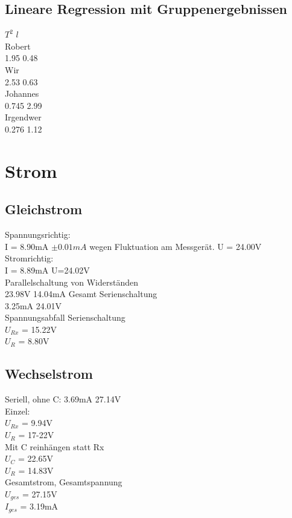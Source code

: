 \documentclass[12pt,a4paper]{article}
\begin{document}
\begin{multicols}{2}
\subsection{Lineare Regression mit Gruppenergebnissen}

$T^2$ $l$\\
Robert\\
1.95
0.48\\
Wir\\
2.53
0.63\\
Johannes\\
0.745
2.99\\
Irgendwer\\
0.276
1.12\\
\section{Strom}

\subsection{Gleichstrom}
Spannungsrichtig:\\
I = 8.90mA $\pm 0.01mA$ wegen Fluktuation am Messgerät.
U = 24.00V
Stromrichtig:\\
I = 8.89mA
U=24.02V
\\
Parallelschaltung von Widerständen\\
23.98V 14.04mA Gesamt
Serienschaltung\\
3.25mA 24.01V\\
Spannungsabfall Serienschaltung\\
$U_{Rx}$ = 15.22V\\
$U_{R}$ = 8.80V
\subsection{Wechselstrom}
Seriell, ohne C: 3.69mA 27.14V\\
Einzel:\\
$U_{Rx}$ = 9.94V\\
$U_{R}$ = 17-22V\\
Mit C reinhängen statt Rx\\
$U_{C}$ = 22.65V\\
$U_{R}$ = 14.83V\\
Gesamtstrom, Gesamtspannung\\
$U_{ges}$ = 27.15V\\
$I_{ges}$ = 3.19mA\\
\end{multicols}
\end{document}
